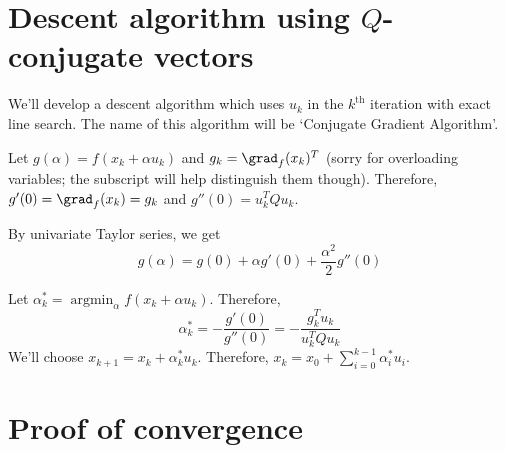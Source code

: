 \section{Descent algorithm using \texorpdfstring{$Q$}{Q}-conjugate vectors}

We'll develop a descent algorithm which uses $u_k$ in the $k^{\textrm{th}}$ iteration
with exact line search. The name of this algorithm will be `Conjugate Gradient Algorithm'.

Let $g(\alpha) = f(x_k + \alpha u_k)$ and $g_k = \grad_f(x_k)^T$
(sorry for overloading variables; the subscript will help distinguish them though).
Therefore, $g'(0) = \grad_f(x_k) = g_k$ and $g''(0) = u_k^TQu_k$.

By univariate Taylor series, we get
\[ g(\alpha) = g(0) + \alpha g'(0) + \frac{\alpha^2}{2} g''(0) \]

Let $\alpha_k^* = \operatorname{argmin}_{\alpha} f(x_k + \alpha u_k)$.
Therefore, \[ \alpha_k^* = - \frac{g'(0)}{g''(0)} = - \frac{g_k^Tu_k}{u_k^TQu_k} \]
We'll choose $x_{k+1} = x_k + \alpha_k^*u_k$.
Therefore, $x_k = x_0 + \sum_{i=0}^{k-1} \alpha_i^* u_i$.

\section{Proof of convergence}

